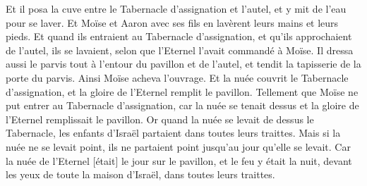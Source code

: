 \begin{multicols}{2}
Et il posa la cuve entre le Tabernacle d'assignation et l'autel, et y mit de l'eau pour se laver.
Et Moïse et Aaron avec ses fils en lavèrent leurs mains et leurs pieds.
Et quand ils entraient au Tabernacle d'assignation, et qu'ils approchaient de l'autel, ils se lavaient, selon que l'Eternel l'avait commandé à Moïse.
Il dressa aussi le parvis tout à l'entour du pavillon et de l'autel, et tendit la tapisserie de la porte du parvis. Ainsi Moïse acheva l'ouvrage.
Et la nuée couvrit le Tabernacle d'assignation, et la gloire de l'Eternel remplit le pavillon.
Tellement que Moïse ne put entrer au Tabernacle d'assignation, car la nuée se tenait dessus et la gloire de l'Eternel remplissait le pavillon.
Or quand la nuée se levait de dessus le Tabernacle, les enfants d'Israël partaient dans toutes leurs traittes.
Mais si la nuée ne se levait point, ils ne partaient point jusqu’au jour qu'elle se levait.
Car la nuée de l'Eternel [était] le jour sur le pavillon, et le feu y était la nuit, devant les yeux de toute la maison d'Israël, dans toutes leurs traittes.
\PPE{}
\end{multicols}
